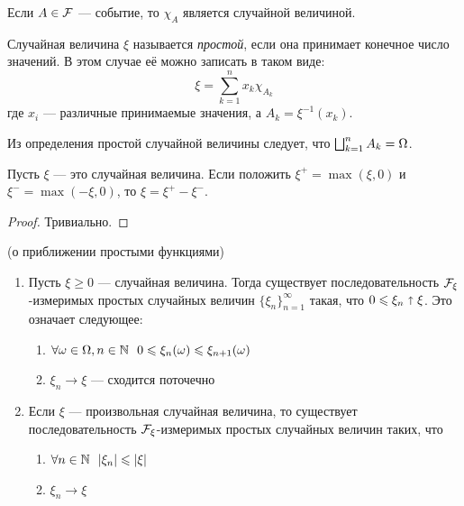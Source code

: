 \begin{exercise}
	Если $A \in \mathcal{F}$ --- событие, то $\chi_A$ является случайной величиной.
\end{exercise}

\begin{definition}
	Случайная величина $\xi$ называется \textit{простой}, если она принимает конечное число значений. В этом случае её можно записать в таком виде:
	\[
		\xi = \sum_{k = 1}^n x_k \chi_{A_k}
	\]
	где $x_i$ --- различные принимаемые значения, а $A_k = \xi^{-1}(x_k)$.
\end{definition}

\begin{note}
	Из определения простой случайной величины следует, что $\bigsqcup_{k = 1}^n A_k = \Omega$.
\end{note}

\begin{proposition}
	Пусть $\xi$ --- это случайная величина. Если положить $\xi^+ = \max(\xi, 0)$ и $\xi^- = \max(-\xi, 0)$, то $\xi = \xi^+ - \xi^-$.
\end{proposition}

\begin{proof}
	Тривиально.
\end{proof}

\begin{theorem} (о приближении простыми функциями)
	\begin{enumerate}
		\item Пусть $\xi \ge 0$ --- случайная величина. Тогда существует последовательность $\mathcal{F}_\xi$-измеримых простых случайных величин $\{\xi_n\}_{n = 1}^\infty$ такая, что $0 \leqslant \xi_n \shortuparrow \xi$. Это означает следующее:
		\begin{enumerate}
			\item $\forall \omega \in \Omega, n \in \N\ \ 0 \le \xi_n(\omega) \le \xi_{n + 1}(\omega)$
			
			\item $\xi_n \to \xi$ --- сходится поточечно
		\end{enumerate}
		
		\item Если $\xi$ --- произвольная случайная величина, то существует последовательность $\mathcal{F}_\xi$-измеримых простых случайных величин таких, что
		\begin{enumerate}
			\item $\forall n \in \mathbb{N}\ \ |\xi_n| \leqslant |\xi|$
			
			\item $\xi_n \to \xi$
		\end{enumerate}
	\end{enumerate}
\end{theorem}

